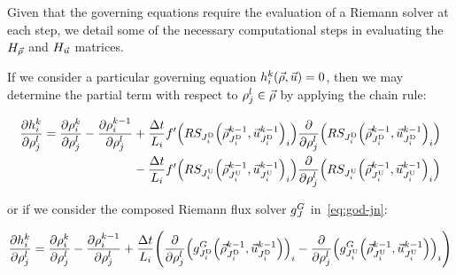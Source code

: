 		Given that the governing equations require the evaluation of a Riemann
		solver at each step, we detail some of the necessary computational
		steps in evaluating the $H_{\vec{\rho}}$ and $H_{\vec{u}}$ matrices. 
		
		If we consider a particular governing equation $\syseq_{\link}^{\tind}\left(\state,\control\right)=0$,
		then we may determine the partial term with respect to $\rho_{j}^{l}\in\vec{\rho}$
		by applying the chain rule:
		
		\begin{align}
			\pfrac{\syseq_{\link}^{\tind}}{\discrete jl}=\pfrac{\discrete{\link}{\tind}}{\discrete jl}-\pfrac{\discrete{\link}{\tind-1}}{\discrete jl} & +\frac{\Delta t}{L_{i}}f'\left(\RS_{\jdown{\link}}\left(\juncstate{\jdown{\link}}{\tind-1},\junccon{\jdown{\link}}{\tind-1}\right)_{\link}\right)\pfrac{}{\discrete jl}\left(\RS_{\jdown{\link}}\left(\juncstate{\jdown{\link}}{\tind-1},\junccon{\jdown{\link}}{\tind-1}\right)_{\link}\right)\label{eq:dhdufull} \\
			                                                                                                                                           & -\frac{\Delta t}{L_{i}}f'\left(\RS_{\jup{\link}}\left(\juncstate{\jup{\link}}{\tind-1},\junccon{\jup{\link}}{\tind-1}\right)_{\link}\right)\pfrac{}{\discrete jl}\left(\RS_{\jup{\link}}\left(\juncstate{\jup{\link}}{\tind-1},\junccon{\jup{\link}}{\tind-1}\right)_{\link}\right)\nonumber                       
		\end{align}
		
		
		or if we consider the composed Riemann flux solver $g^{G}_{J}$ in~\eqref{eq:god-jn}:
		
		\begin{equation}
			\pfrac{\syseq_{\link}^{\tind}}{\discrete jl}=\pfrac{\discrete{\link}{\tind}}{\discrete jl}-\pfrac{\discrete{\link}{\tind-1}}{\discrete jl}+\frac{\Delta t}{L_{i}}\left(\pfrac{}{\discrete jl}\left(\god_{\jdown{\link}}\left(\juncstate{\jdown{\link}}{\tind-1},\junccon{\jdown{\link}}{\tind-1}\right)\right)_{\link}-\pfrac{}{\discrete jl}\left(\god_{\jup{\link}}\left(\juncstate{\jup{\link}}{\tind-1},\junccon{\jup{\link}}{\tind-1}\right)\right)_{\link}\right)\label{eq:dhdugod}
		\end{equation}
		
